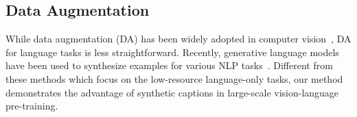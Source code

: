 \vspace{-1ex}
\subsection{Data Augmentation}
\vspace{-0.5ex}
While data augmentation (DA) has been widely adopted in computer vision~\cite{DA_survey},
DA for language tasks is less straightforward.
Recently,
generative language models have been used to synthesize examples for various NLP tasks~\cite{DA,DA_AAAI,DA_QA,DA_commonsense}.
Different from these methods which focus on the low-resource language-only tasks,
our method demonstrates the advantage of synthetic captions in large-scale vision-language pre-training.

